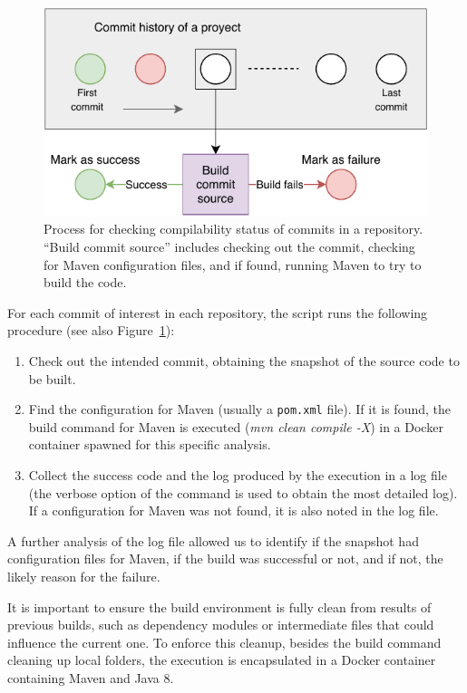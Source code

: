 \begin{figure}[t]
\centering    
\includegraphics[width=\textwidth]{pages/01-Buildability/images/AnalysisProcess.pdf}
\caption{Process for checking compilability status of commits in a repository. ``Build commit source'' includes checking out the commit, checking for Maven configuration files, and if found, running Maven to try to build the code.}
\label{fig:commitHist}
\end{figure}

For each commit of interest in each repository, the script runs the following procedure (see also Figure~\ref{fig:commitHist}):
\begin{enumerate}
\item Check out the intended commit, obtaining the snapshot of the source code to be built.
\item Find the configuration for Maven (usually a \verb|pom.xml| file). If it is found, the build command for Maven is executed (\textit{mvn clean compile -X}) in a Docker container spawned for this specific analysis.
\item Collect the success code and the log produced by the execution in a log file (the verbose option of the command is used to obtain the most detailed log). If a configuration for Maven was not found, it is also noted in the log file.
\end{enumerate}

A further analysis of the log file allowed us to identify if the snapshot had configuration files for Maven, if the build was successful or not, and if not, the likely reason for the failure.

It is important to ensure the build environment is fully clean from results of previous builds, such as dependency modules or intermediate files that could influence the current one. To enforce this cleanup, besides the build command cleaning up local folders, the execution is encapsulated in a Docker container containing Maven and Java 8.

